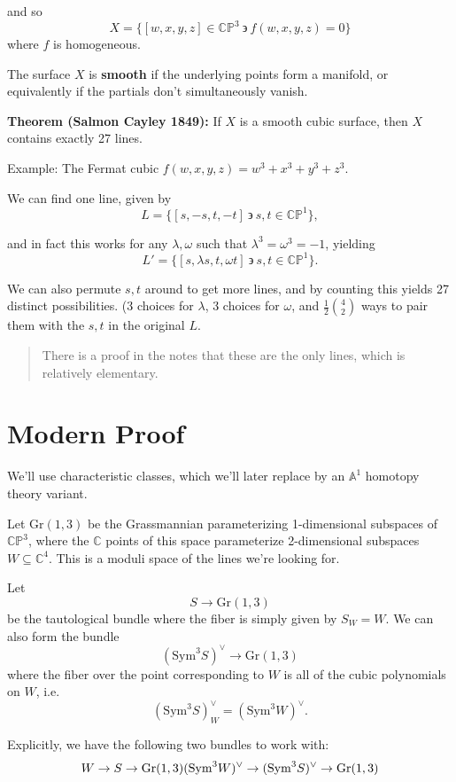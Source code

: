\documentclass[11pt]{scrreprt}
\theoremstyle{definition}
\newcommand{\CC}[0]{{\mathbb{C}}}
\newcommand{\CP}[0]{{\mathbb{CP}}}
\newcommand{\Af}[0]{{\mathbb{A}}}
\newcommand{\Gr}[0]{{\text{Gr}}}
\newcommand{\dual}[0]{\vee}
\newcommand{\sym}[0]{\mathrm{Sym}}
\newcommand{\suchthat}[0]{{~\backepsilon ~}}
\newcommand{\theset}[1]{\{{#1}\}}
\begin{document}
and so \[
X = \theset{[w,x,y,z] \in \CP^3 \suchthat f(w,x,y,z) = 0}
\] where \(f\) is homogeneous.

The surface \(X\) is \textbf{smooth} if the underlying points form a
manifold, or equivalently if the partials don't simultaneously vanish.

\textbf{Theorem (Salmon Cayley 1849):} If \(X\) is a smooth cubic
surface, then \(X\) contains exactly 27 lines.

Example: The Fermat cubic \(f(w,x,y,z) = w^3 + x^3 + y^3 + z^3\).

We can find one line, given by \[
L = \theset{[s,-s,t,-t] \suchthat s,t \in \CP^1},
\]

and in fact this works for any \(\lambda, \omega\) such that
\(\lambda^3 = \omega^3 = -1\), yielding \[
L' = \theset{[s,\lambda s,t,\omega t] \suchthat s,t \in \CP^1}.
\]

We can also permute \(s,t\) around to get more lines, and by counting
this yields 27 distinct possibilities. (3 choices for \(\lambda\), 3
choices for \(\omega\), and \(\frac 1 2 {4\choose 2}\) ways to pair them
with the \(s,t\) in the original \(L\).

\begin{quote}
There is a proof in the notes that these are the only lines, which is
relatively elementary.
\end{quote}

\hypertarget{modern-proof}{%
\section{Modern Proof}\label{modern-proof}}

We'll use characteristic classes, which we'll later replace by an
\(\Af^1\) homotopy theory variant.

Let \(\Gr(1,3)\) be the Grassmannian parameterizing 1-dimensional
subspaces of \(\CP^3\), where the \(\CC\) points of this space
parameterize 2-dimensional subspaces \(W \subseteq \CC^4\). This is a
moduli space of the lines we're looking for.

Let \[S \to \Gr(1,3)\] be the tautological bundle where the fiber is
simply given by \(S_W = W\). We can also form the bundle
\[(\sym^3 S)^\dual \to \Gr(1,3)\] where the fiber over the point
corresponding to \(W\) is all of the cubic polynomials on \(W\),
i.e.~\[(\sym^3 S)^\dual_W = (\sym^3 W)^\dual.\]

Explicitly, we have the following two bundles to work with: \[
W \to S \to \Gr(1,3) \\
(\sym^3 W)^\dual \to (\sym^3 S)^\dual \to \Gr(1,3)
\]
\end{document}
